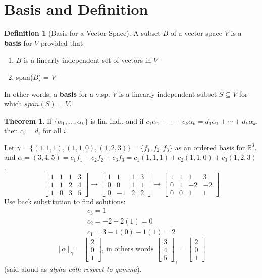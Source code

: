 \documentclass{article}
\renewcommand{\bf}[1]{\textbf{#1}}
\theoremstyle{definition}
\newtheorem{theorem}{Theorem}
\newtheorem{definition}{Definition}
\newcommand{\reals}{\mathbb{R}}
\newcommand{\bmat}[1]{\begin{bmatrix}#1\end{bmatrix}}
\begin{document}
\section{Basis and Definition}
	\begin{definition}[Basis for a Vector Space]
		A subset $B$ of a vector space $V$ is a \textbf{basis} for $V$ provided that
		\begin{enumerate}[font=\bfseries,itemsep=0pt]
			\item $B$ is a linearly independent set of vectors in $V$
			\item span($B$) = $V$
		\end{enumerate}
		In other words, a \bf{basis} for a v.sp. $V$ is a linearly independent subset $S \subseteq V$ for which $span(S) = V$.
	\end{definition}
	\begin{theorem}
		If $\{\alpha_1, ..., \alpha_k\}$ is lin. ind., and if $c_1\alpha_1 + \cdots + c_k\alpha_k = d_1\alpha_1 + \cdots + d_k\alpha_k$, then $c_i = d_i$ for all $i$.
	\end{theorem}
	Let $\gamma = \{(1,1,1),(1,1,0),(1,2,3)\} = \{f_1,f_2,f_3\}$ as an ordered basis for $\reals^3$. and $\alpha = (3,4,5) = c_1f_1 + c_2f_2 + c_3f_3 = c_1(1,1,1) + c_2(1,1,0) + c_3(1,2,3)$.\\
	\[ \bmat{1&1&1&3\\1&1&2&4\\1&0&3&5} \longrightarrow \bmat{1&1&1&3\\0&0&1&1\\0&-1&2&2} \longrightarrow \bmat{1&1&1&3\\0&1&-2&-2\\0&0&1&1}\]
	Use back substitution to find solutions:
	\begin{align*}
		c_3 = 1\\
		c_2 = -2 + 2(1) = 0\\
		c_1 = 3 - 1(0) - 1(1) = 2
	\end{align*}
	\[ [\alpha]_\gamma = \bmat{2\\0\\1} \text{, in others words } \bmat{3\\4\\5}_\gamma = \bmat{2\\0\\1} \]
	(said aloud as \emph{alpha with respect to gamma}).
\end{document}
